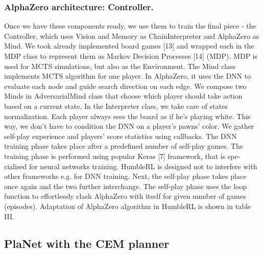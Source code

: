 \subsubsection{AlphaZero architecture: Controller.}
Once we have these components ready, we use them to train the final piece - the Controller, which uses Vision and Memory as ChainInterpreter and AlphaZero as Mind. 
We took already implemented board games [13] and wrapped each in the MDP class to represent them as Markov Decision Processes [14] (MDP). MDP is used for MCTS simulations, but also as the Environment. The Mind class implements MCTS algorithm for one player. In AlphaZero, it uses the DNN to evaluate each node and guide search direction on each edge. We compose two Minds in AdversarialMind class that choose which player should take action based on a current state. In the Interpreter class, we take care of states normalization. Each player always sees the board as if he’s playing white. This way, we don’t have to condition the DNN on a player’s pawns’ color.
We gather self-play experience and players’ score statistics using callbacks. The DNN training phase takes place after a predefined number of self-play games. The training phase is performed using popular Keras [7] framework, that is spe- cialised for neural networks training. HumbleRL is designed not to interfere with other frameworks e.g. for DNN training. Next, the self-play phase takes place once again and the two further interchange. The self-play phase uses the loop function to effortlessly clash AlphaZero with itself for given number of games (episodes). Adaptation of AlphaZero algorithm in HumbleRL is shown in table III.


\subsection{PlaNet with the CEM planner}

